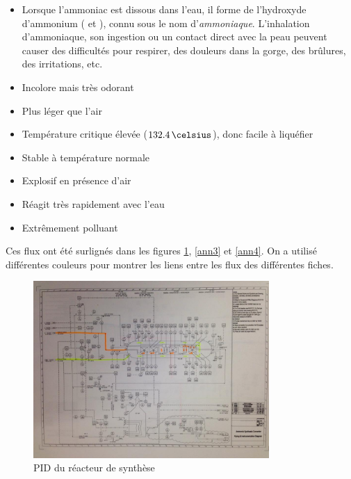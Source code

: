 \begin{enumerate}
\begin{itemize}
\item Lorsque l'ammoniac est dissous dans l'eau, il forme de l'hydroxyde d'ammonium ( et ), connu sous le nom d'\emph{ammoniaque}. L'inhalation d'ammoniaque, son ingestion ou un contact direct avec la peau peuvent causer des difficultés pour respirer, des douleurs dans la gorge, des brûlures, des irritations, etc.
\item Incolore mais très odorant
\item Plus léger que l’air
\item Température critique élevée ($132.4\,\celsius$), donc facile à liquéfier
\item Stable à température normale
\item Explosif en présence d’air
\item Réagit très rapidement avec l’eau
\item Extrêmement polluant
\end{itemize}
\end{enumerate}

Ces flux ont été surlignés dans les figures \ref{ann2}, \ref{ann3} et \ref{ann4}. On a utilisé différentes couleurs pour montrer les liens entre les flux des différentes fiches.


\begin{figure}
\centering
\includegraphics[width=0.8\textwidth]{img/hazop1}
\caption{PID du réacteur de synthèse}
\label{ann2}
\end{figure}

